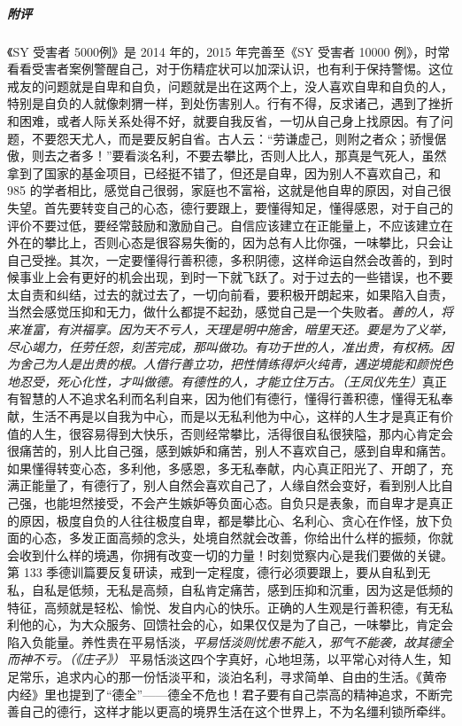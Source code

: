 \begin{case}
    \subparagraph{附评} 《SY 受害者 5000例》是 2014 年的，2015 年完善至《SY 受害者 10000 例》，时常看看受害者案例警醒自己，对于伤精症状可以加深认识，也有利于保持警惕。这位戒友的问题就是自卑和自负，问题就是出在这两个上，没人喜欢自卑和自负的人，特别是自负的人就像刺猬一样，到处伤害别人。行有不得，反求诸己，遇到了挫折和困难，或者人际关系处得不好，就要自我反省，一切从自己身上找原因。有了问题，不要怨天尤人，而是要反躬自省。古人云：“劳谦虚己，则附之者众；骄慢倨傲，则去之者多！”要看淡名利，不要去攀比，否则人比人，那真是气死人，虽然拿到了国家的基金项目，已经挺不错了，但还是自卑，因为别人不喜欢自己，和 985 的学者相比，感觉自己很弱，家庭也不富裕，这就是他自卑的原因，对自己很失望。首先要转变自己的心态，德行要跟上，要懂得知足，懂得感恩，对于自己的评价不要过低，要经常鼓励和激励自己。自信应该建立在正能量上，不应该建立在外在的攀比上，否则心态是很容易失衡的，因为总有人比你强，一味攀比，只会让自己受挫。其次，一定要懂得行善积德，多积阴德，这样命运自然会改善的，到时候事业上会有更好的机会出现，到时一下就飞跃了。对于过去的一些错误，也不要太自责和纠结，过去的就过去了，一切向前看，要积极开朗起来，如果陷入自责，当然会感觉压抑和无力，做什么都提不起劲，感觉自己是一个失败者。\textit{善的人，将来准富，有洪福享。因为天不亏人，天理是明中施舍，暗里天还。要是为了义举，尽心竭力，任劳任怨，刻苦完成，那叫做功。有功于世的人，准出贵，有权柄。因为舍己为人是出贵的根。人借行善立功，把性情练得炉火纯青，遇逆境能和颜悦色地忍受，死心化性，才叫做德。有德性的人，才能立住万古。（王凤仪先生）}真正有智慧的人不追求名利而名利自来，因为他们有德行，懂得行善积德，懂得无私奉献，生活不再是以自我为中心，而是以无私利他为中心，这样的人生才是真正有价值的人生，很容易得到大快乐，否则经常攀比，活得很自私很狭隘，那内心肯定会很痛苦的，别人比自己强，感到嫉妒和痛苦，别人不喜欢自己，感到自卑和痛苦。如果懂得转变心态，多利他，多感恩，多无私奉献，内心真正阳光了、开朗了，充满正能量了，有德行了，别人自然会喜欢自己了，人缘自然会变好，看到别人比自己强，也能坦然接受，不会产生嫉妒等负面心态。自负只是表象，而自卑才是真正的原因，极度自负的人往往极度自卑，都是攀比心、名利心、贪心在作怪，放下负面的心态，多发正面高频的念头，处境自然就会改善，你给出什么样的振频，你就会收到什么样的境遇，你拥有改变一切的力量！时刻觉察内心是我们要做的关键。第 133 季德训篇要反复研读，戒到一定程度，德行必须要跟上，要从自私到无私，自私是低频，无私是高频，自私肯定痛苦，感到压抑和沉重，因为这是低频的特征，高频就是轻松、愉悦、发自内心的快乐。正确的人生观是行善积德，有无私利他的心，为大众服务、回馈社会的心，如果仅仅是为了自己，一味攀比，肯定会陷入负能量。养性贵在平易恬淡，\textit{平易恬淡则忧患不能入，邪气不能袭，故其德全而神不亏。（《庄子》）} 平易恬淡这四个字真好，心地坦荡，以平常心对待人生，知足常乐，追求内心的那一份恬淡平和，淡泊名利，寻求简单、自由的生活。《黄帝内经》里也提到了“德全”——德全不危也！君子要有自己崇高的精神追求，不断完善自己的德行，这样才能以更高的境界生活在这个世界上，不为名缰利锁所牵绊。
\end{case}

